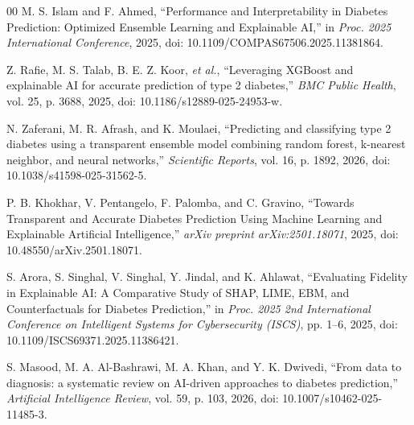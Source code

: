 \documentclass[conference]{IEEEtran}
\begin{document}
\begin{thebibliography}{00}
M. S. Islam and F. Ahmed,
``Performance and Interpretability in Diabetes Prediction:
Optimized Ensemble Learning and Explainable AI,''
in \textit{Proc. 2025 International Conference},
2025,
doi: 10.1109/COMPAS67506.2025.11381864.

Z. Rafie, M. S. Talab, B. E. Z. Koor, \textit{et al.},
``Leveraging XGBoost and explainable AI for accurate prediction
of type 2 diabetes,''
\textit{BMC Public Health},
vol. 25,
p. 3688,
2025,
doi: 10.1186/s12889-025-24953-w.

N. Zaferani, M. R. Afrash, and K. Moulaei,
``Predicting and classifying type 2 diabetes using a transparent
ensemble model combining random forest, k-nearest neighbor,
and neural networks,''
\textit{Scientific Reports},
vol. 16,
p. 1892,
2026,
doi: 10.1038/s41598-025-31562-5.

P. B. Khokhar, V. Pentangelo, F. Palomba, and C. Gravino,
``Towards Transparent and Accurate Diabetes Prediction Using
Machine Learning and Explainable Artificial Intelligence,''
\textit{arXiv preprint arXiv:2501.18071},
2025,
doi: 10.48550/arXiv.2501.18071.

S. Arora, S. Singhal, V. Singhal, Y. Jindal, and K. Ahlawat,
``Evaluating Fidelity in Explainable AI: A Comparative Study
of SHAP, LIME, EBM, and Counterfactuals for Diabetes Prediction,''
in \textit{Proc. 2025 2nd International Conference on Intelligent
Systems for Cybersecurity (ISCS)},
pp. 1--6,
2025,
doi: 10.1109/ISCS69371.2025.11386421.

S. Masood, M. A. Al-Bashrawi, M. A. Khan, and Y. K. Dwivedi,
``From data to diagnosis: a systematic review on AI-driven
approaches to diabetes prediction,''
\textit{Artificial Intelligence Review},
vol. 59,
p. 103,
2026,
doi: 10.1007/s10462-025-11485-3.

\end{thebibliography}
\end{document}

